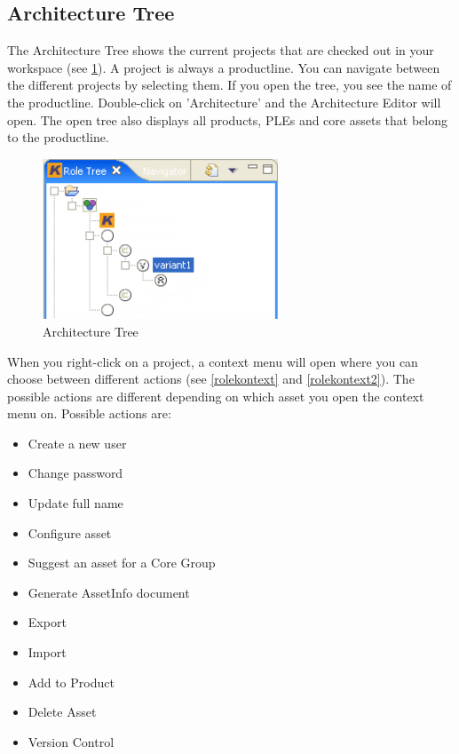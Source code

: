 \subsection{Architecture Tree}

The Architecture Tree shows the current projects that are checked out in your workspace 
(see \ref{roletree}).
A project is always a productline. You can navigate between the 
different projects by selecting them. If you open the tree, you see the name
of the productline. Double-click on 'Architecture' and the Architecture Editor will open. The open tree also 
displays all products, PLEs and core assets that belong to the productline.

\begin{figure}[h!]
\begin{center}
\includegraphics[width=7cm]{roletree.png}
   \caption{Architecture Tree}
\label{roletree}
\end{center}
\end{figure}\par

When you right-click on a project, a context menu will open where you can choose 
between different actions (see \ref{rolekontext} and \ref{rolekontext2}). The possible actions are different
depending on which asset you open the context menu on. Possible actions are:

\begin{itemize}
	\item Create a new user
	\item Change password
	\item Update full name
	\item Configure asset
	\item Suggest an asset for a Core Group
	\item Generate AssetInfo document
	\item Export
	\item Import
	\item Add to Product
	\item Delete Asset
	\item Version Control
\end{itemize}

